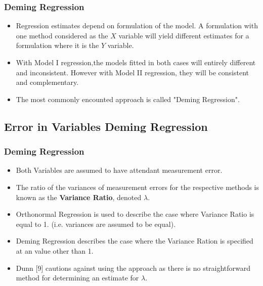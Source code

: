 \documentclass[compress]{beamer}        %
\begin{document}
\begin{frame}
\frametitle{Deming Regression}
\large
\begin{itemize}

\item Regression estimates depend on formulation of the model. A
formulation with one method considered as the $X$ variable will
yield different estimates for a formulation where it is the $Y$
variable. 

\item With Model I regression,the models fitted in both cases
will entirely different and inconsistent.  However with Model II
regression, they will be consistent and complementary.

\item The most commonly encounted approach is called "Deming Regression".

\end{itemize}

\end{frame}



\subsection{Error in Variables Deming Regression}
\begin{frame}


\frametitle{Deming Regression}
\begin{itemize}
\item Both Variables are assumed to have attendant measurement error.
\item The ratio of the variances of measurement errors for the respective methods is known as the \textbf{Variance Ratio}, denoted $\lambda$.
\item Orthonormal Regression is used to describe the case where Variance Ratio is equal to 1. (i.e. variances are assumed to be equal).
\item Deming Regression describes the case where the Variance Ration is specified at an value other than 1.
\item Dunn [9] cautions against using the approach as there is no straightforward method for determining an estimate for $\lambda$.
\end{itemize}

\end{frame}
\end{document}
